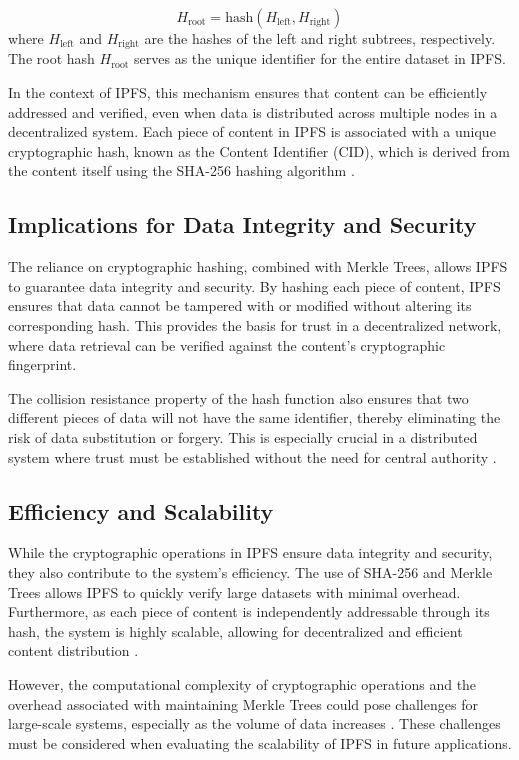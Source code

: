 \documentclass{article}
\begin{document}
\[
    H_{\text{root}} = \text{hash}(H_{\text{left}}, H_{\text{right}})
\]
where $H_{\text{left}}$ and $H_{\text{right}}$ are the hashes of the left and right subtrees, respectively. The root hash $H_{\text{root}}$ serves as the unique identifier for the entire dataset in IPFS.

In the context of IPFS, this mechanism ensures that content can be efficiently addressed and verified, even when data is distributed across multiple nodes in a decentralized system. Each piece of content in IPFS is associated with a unique cryptographic hash, known as the Content Identifier (CID), which is derived from the content itself using the SHA-256 hashing algorithm \cite{ipfs2015}.

\subsection{Implications for Data Integrity and Security}

The reliance on cryptographic hashing, combined with Merkle Trees, allows IPFS to guarantee data integrity and security. By hashing each piece of content, IPFS ensures that data cannot be tampered with or modified without altering its corresponding hash. This provides the basis for trust in a decentralized network, where data retrieval can be verified against the content's cryptographic fingerprint.

The collision resistance property of the hash function also ensures that two different pieces of data will not have the same identifier, thereby eliminating the risk of data substitution or forgery. This is especially crucial in a distributed system where trust must be established without the need for central authority \cite{cachin2016blockchains}.

\subsection{Efficiency and Scalability}

While the cryptographic operations in IPFS ensure data integrity and security, they also contribute to the system's efficiency. The use of SHA-256 and Merkle Trees allows IPFS to quickly verify large datasets with minimal overhead. Furthermore, as each piece of content is independently addressable through its hash, the system is highly scalable, allowing for decentralized and efficient content distribution \cite{budiu2007designing}.

However, the computational complexity of cryptographic operations and the overhead associated with maintaining Merkle Trees could pose challenges for large-scale systems, especially as the volume of data increases \cite{tapscott2016blockchain}. These challenges must be considered when evaluating the scalability of IPFS in future applications.
\end{document}
